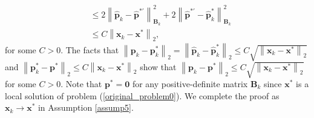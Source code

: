 \documentclass[aos]{imsart}
\numberwithin{equation}{section}
\theoremstyle{plain}
\begin{document}
\begin{appendix}
\begin{equation}
\begin{split}
            & \leq 2 \left\| \hat{\bm{p}}_{k} -\hat{\bm{p}}^{* \prime}  \right\|_{\bm{B}_{k}}^2 + 2 \left\| \hat{\bm{p}}^{* \prime} - \hat{\bm{p}}_{k}^{*} \right\|_{\bm{B}_{k}}^2 \\
            & \leq C \left\| \bm{x}_{k} - \bm{x}^{*} \right\|_2,
        \end{split}
    \end{equation}
    for some $C > 0$. The facts that $\left \| \bm{p}_{k} - \bm{p}_{k}^{*} \right\|_2 = \left \| \hat{\bm{p}}_{k} - \hat{\bm{p}}_{k}^{*} \right\|_2 \leq C \sqrt{\left\| \bm{x}_{k} - \bm{x}^{*} \right\|_2}$ and $\left\| \bm{p}_{k}^{*} - \bm{p}^{*} \right\|_2 \leq C \left\| \bm{x}_{k} - \bm{x}^{*} \right\|_2$ show that $\left \| \bm{p}_{k} - \bm{p}^{*} \right\|_2  \leq C \sqrt{\left\| \bm{x}_{k} - \bm{x}^{*} \right\|_2}$ for some $C > 0$. Note that $\bm{p}^{*} = \bm{0}$ for any positive-definite matrix $\bm{B}_{k}$ since $\bm{x}^{*}$ is a local solution of problem (\ref{original_problem0}). We complete the proof as $\bm{x}_{k} \to \bm{x}^{*}$ in Assumption \ref{assump5}. 


\end{appendix}
\end{document}
